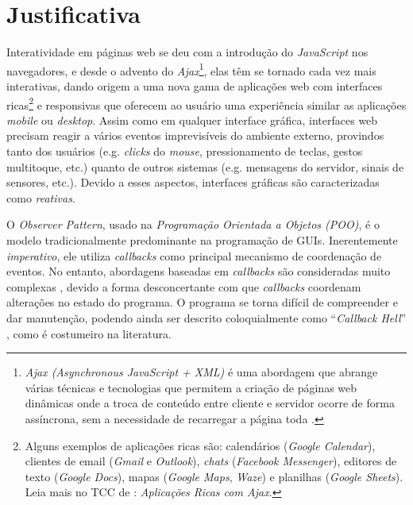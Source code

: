 \section{Justificativa}\label{ljustificativa}

Interatividade em páginas web se deu com a
introdução do \emph{JavaScript} nos navegadores,
e desde o advento do \emph{Ajax}\footnote{
  \emph{Ajax (Asynchronous JavaScript + XML)} é uma
  abordagem que abrange várias técnicas e
  tecnologias que permitem a criação de páginas web
  dinâmicas onde a troca de conteúdo entre cliente e
  servidor ocorre de forma assíncrona, sem a necessidade
  de recarregar a página toda \cite{garrett2005ajax}.
},
elas têm se tornado cada vez mais interativas,
dando origem a uma nova gama de aplicações web com interfaces
ricas\footnote{
  Alguns exemplos de aplicações ricas são:
  calendários (\emph{Google Calendar}),
  clientes de email (\emph{Gmail} e \emph{Outlook}),
  \emph{chats} (\emph{Facebook Messenger}),
  editores de texto (\emph{Google Docs}),
  mapas (\emph{Google Maps}, \emph{Waze}) e
  planilhas (\emph{Google Sheets}).
  Leia mais no TCC de :
  \emph{Aplicações Ricas com Ajax}.
} e responsivas que oferecem ao usuário uma experiência
similar as aplicações \emph{mobile} ou \emph{desktop}.
Assim como em qualquer interface gráfica, interfaces web
precisam reagir a vários eventos imprevisíveis do ambiente
externo, provindos tanto dos usuários (e.g. \emph{clicks}
do \emph{mouse}, pressionamento de teclas, gestos multitoque,
etc.) quanto de outros sistemas (e.g. mensagens do servidor,
sinais de sensores, etc.).
Devido a esses aspectos, interfaces gráficas são caracterizadas
como \emph{reativas}.

O \emph{Observer Pattern}, usado na \emph{Programação Orientada
a Objetos (POO)}, é o modelo tradicionalmente predominante na
programação de GUIs.
Inerentemente \emph{imperativo}, ele utiliza \emph{callbacks}
como principal mecanismo de coordenação de eventos.
No entanto, abordagens baseadas em \emph{callbacks} são
consideradas muito complexas \cite{
  edwards2009coherent,
  fischer2007tasks,
  maier2010deprecating,
  reppy1992higher},
devido a forma desconcertante com que \emph{callbacks}
coordenam alterações no estado do programa.
O programa se torna difícil de compreender e dar manutenção,
podendo ainda ser descrito coloquialmente como \enquote{\emph{Callback Hell}}
\cite[p.~2]{edwards2009coherent}, como é costumeiro na literatura.

